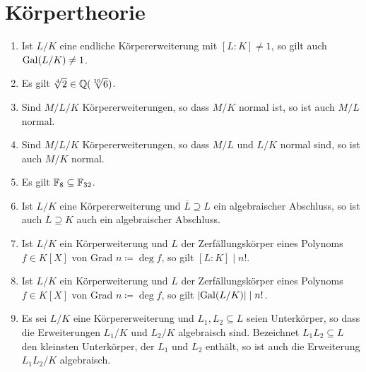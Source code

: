 \section{Körpertheorie}





\begin{question}[subtitle = Wahr oder Falsch?]
  \begin{enumerate}
    \item
      Ist $L/K$ eine endliche Körpererweiterung mit $[L : K] \neq 1$, so gilt auch $\operatorname{Gal}(L/K) \neq 1$.
    \item
      Es gilt $\sqrt[4]{2} \in \mathbb{Q}(\sqrt[10]{6})$.
    \item
      Sind $M/L/K$ Körpererweiterungen, so dass $M/K$ normal ist, so ist auch $M/L$ normal.
    \item
      Sind $M/L/K$ Körpererweiterungen, so dass $M/L$ und $L/K$ normal sind, so ist auch $M/K$ normal.
    \item
      Es gilt $\mathbb{F}_{8} \subseteq \mathbb{F}_{32}$.
    \item
      Ist $L/K$ eine Körpererweiterung und $\overline{L} \supseteq L$ ein algebraischer Abschluss, so ist auch $\overline{L} \supseteq K$ auch ein algebraischer Abschluss.
    \item
      Ist $L/K$ ein Körperweiterung und $L$ der Zerfällungskörper eines Polynoms $f \in K[X]$ von Grad $n \coloneqq \deg f$, so gilt $[L : K] \mid n!$.
    \item
      Ist $L/K$ ein Körperweiterung und $L$ der Zerfällungskörper eines Polynoms $f \in K[X]$ von Grad $n \coloneqq \deg f$, so gilt $|{\operatorname{Gal}(L/K)}| \mid n!$.
    \item
      Es sei $L/K$ eine Körpererweiterung und $L_1, L_2 \subseteq L$ seien Unterkörper, so dass die Erweiterungen $L_1/K$ und $L_2/K$ algebraisch sind.
      Bezeichnet $L_1 L_2 \subseteq L$ den kleinsten Unterkörper, der $L_1$ und $L_2$ enthält, so ist auch die Erweiterung $L_1 L_2/K$ algebraisch.
  \end{enumerate}
\end{question}


